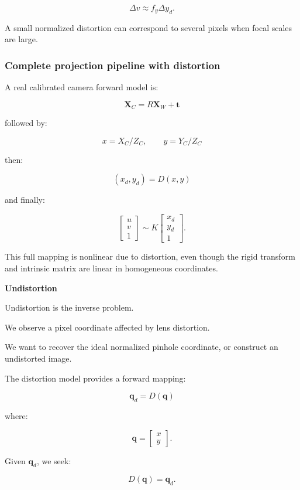 \[
 \Delta v\approx f_y\Delta y_d.
\]

A small normalized distortion can correspond to several pixels when focal scales are large.

\subsubsection{Complete projection pipeline with distortion}\label{complete-projection-pipeline-with-distortion}

A real calibrated camera forward model is:

\[
 \boxed{ \mathbf X_C=R\mathbf X_W+\mathbf t }
\]

followed by:

\[
 \boxed{ x=X_C/Z_C,\qquad y=Y_C/Z_C }
\]

then:

\[
 \boxed{ (x_d,y_d)=D(x,y) }
\]

and finally:

\[
 \boxed{ \begin{bmatrix}u\\v\\1\end{bmatrix} \sim K \begin{bmatrix}x_d\\y_d\\1\end{bmatrix} }.
\]

This full mapping is nonlinear due to distortion, even though the rigid transform and intrinsic matrix are linear in homogeneous coordinates.

\textbf{Undistortion}

Undistortion is the inverse problem.

We observe a pixel coordinate affected by lens distortion.

We want to recover the ideal normalized pinhole coordinate, or construct an undistorted image.

The distortion model provides a forward mapping:

\[
 \boxed{ \mathbf q_d=D(\mathbf q) }
\]

where:

\[
 \mathbf q= \begin{bmatrix}x\\y\end{bmatrix}.
\]

Given \(\mathbf q_d\), we seek:

\[
 \boxed{ D(\mathbf q)=\mathbf q_d }.
\]

